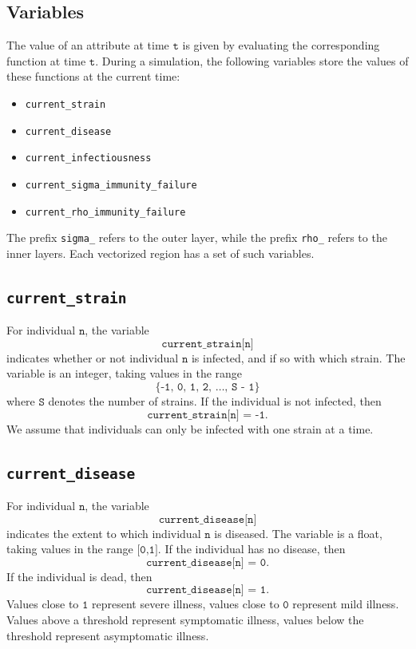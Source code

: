 \documentclass[10pt,letterpaper]{article}
\begin{document}
\subsection*{Variables}
The value of an attribute at time $\texttt{t}$ is given by evaluating the corresponding function at time $\texttt{t}$. During a simulation, the following variables store the values of these functions at the current time:
\begin{itemize}
\item \texttt{current{\_}strain}
\item \texttt{current{\_}disease}
\item \texttt{current{\_}infectiousness}
\item \texttt{current{\_}sigma{\_}immunity{\_}failure}
\item \texttt{current{\_}rho{\_}immunity{\_}failure}
\end{itemize}
The prefix \texttt{sigma{\_}} refers to the outer layer, while the prefix \texttt{rho{\_}} refers to the inner layers. Each vectorized region has a set of such variables.

\subsection*{\texttt{current{\_}strain}}
For individual $\texttt{n}$, the variable $$\texttt{current{\_}strain[n]}$$ indicates whether or not individual $\texttt{n}$ is infected, and if so with which strain. The variable is an integer, taking values in the range $$\texttt{\{-1, 0, 1, 2, \ldots, S - 1\}}$$ where $\texttt{S}$ denotes the number of strains. If the individual is not infected, then $$\texttt{current{\_}strain[n] = -1}.$$ We assume that individuals can only be infected with one strain at a time.

\subsection*{\texttt{current{\_}disease}}
For individual $\texttt{n}$, the variable $$\texttt{current{\_}disease[n]}$$ indicates the extent to which individual $\texttt{n}$ is diseased. The variable is a float, taking values in the range $\texttt{[0,1]}.$ If the individual has no disease, then $$\texttt{current{\_}disease[n] = 0}.$$ If the individual is dead, then $$\texttt{current{\_}disease[n] = 1}.$$ Values close to $\texttt{1}$ represent severe illness, values close to $\texttt{0}$ represent mild illness. Values above a threshold represent symptomatic illness, values below the threshold represent asymptomatic illness. 
\end{document}
